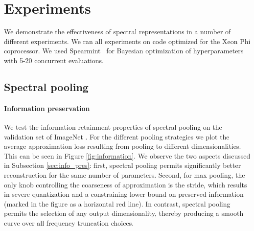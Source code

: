 \documentclass{article} %
\begin{document}
\section{Experiments}
\label{sec:experiments}
We demonstrate the effectiveness of spectral representations in a number of different experiments. We ran all experiments on code optimized for the Xeon Phi coprocessor. We used Spearmint~\citep{scalable_2015} for Bayesian optimization of hyperparameters with 5-20 concurrent evaluations.
\subsection{Spectral pooling}
\paragraph{Information preservation} We test the information retainment properties of spectral pooling on the validation set of ImageNet \citep{ILSVRC15}. For the different pooling strategies we plot the average approximation loss resulting from pooling to different dimensionalities. This can be seen in Figure \ref{fig:information}. We observe the two aspects discussed in Subsection \ref{sec:info_pres}: first, spectral pooling permits significantly better reconstruction for the same number of parameters. Second, for max pooling, the only knob controlling the coarseness of approximation is the stride, which results in severe quantization and a constraining lower bound on preserved information (marked in the figure as a horizontal red line). In contrast, spectral pooling permits the selection of any output dimensionality, thereby producing a smooth curve over all frequency truncation choices.
\end{document}

